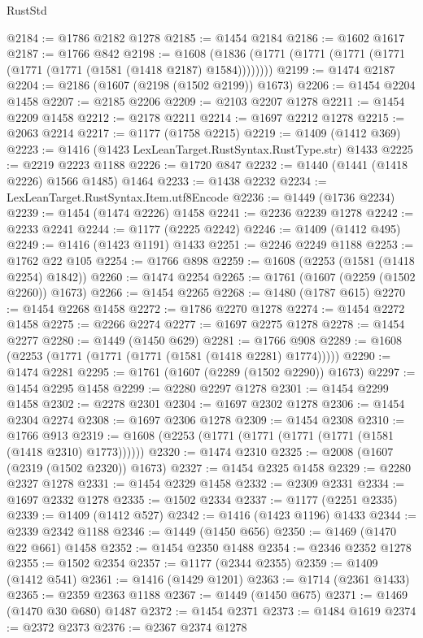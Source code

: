 \begin{lexlean}{RustStd}
\begin{coremodule}
@2184 := @1786 @2182 @1278
@2185 := @1454 @2184
@2186 := @1602 @1617
@2187 := @1766 @842
@2198 := @1608 (@1836 (@1771 (@1771 (@1771 (@1771 (@1771 (@1771 (@1581 (@1418 @2187) @1584))))))))
@2199 := @1474 @2187
@2204 := @2186 (@1607 (@2198 (@1502 @2199)) @1673)
@2206 := @1454 @2204 @1458
@2207 := @2185 @2206
@2209 := @2103 @2207 @1278
@2211 := @1454 @2209 @1458
@2212 := @2178 @2211
@2214 := @1697 @2212 @1278
@2215 := @2063 @2214
@2217 := @1177 (@1758 @2215)
@2219 := @1409 (@1412 @369)
@2223 := @1416 (@1423 LexLeanTarget.RustSyntax.RustType.str) @1433
@2225 := @2219 @2223 @1188
@2226 := @1720 @847
@2232 := @1440 (@1441 (@1418 @2226) @1566 @1485) @1464
@2233 := @1438 @2232
@2234 := LexLeanTarget.RustSyntax.Item.utf8Encode
@2236 := @1449 (@1736 @2234)
@2239 := @1454 (@1474 @2226) @1458
@2241 := @2236 @2239 @1278
@2242 := @2233 @2241
@2244 := @1177 (@2225 @2242)
@2246 := @1409 (@1412 @495)
@2249 := @1416 (@1423 @1191) @1433
@2251 := @2246 @2249 @1188
@2253 := @1762 @22 @105
@2254 := @1766 @898
@2259 := @1608 (@2253 (@1581 (@1418 @2254) @1842))
@2260 := @1474 @2254
@2265 := @1761 (@1607 (@2259 (@1502 @2260)) @1673)
@2266 := @1454 @2265
@2268 := @1480 (@1787 @615)
@2270 := @1454 @2268 @1458
@2272 := @1786 @2270 @1278
@2274 := @1454 @2272 @1458
@2275 := @2266 @2274
@2277 := @1697 @2275 @1278
@2278 := @1454 @2277
@2280 := @1449 (@1450 @629)
@2281 := @1766 @908
@2289 := @1608 (@2253 (@1771 (@1771 (@1771 (@1581 (@1418 @2281) @1774)))))
@2290 := @1474 @2281
@2295 := @1761 (@1607 (@2289 (@1502 @2290)) @1673)
@2297 := @1454 @2295 @1458
@2299 := @2280 @2297 @1278
@2301 := @1454 @2299 @1458
@2302 := @2278 @2301
@2304 := @1697 @2302 @1278
@2306 := @1454 @2304 @2274
@2308 := @1697 @2306 @1278
@2309 := @1454 @2308
@2310 := @1766 @913
@2319 := @1608 (@2253 (@1771 (@1771 (@1771 (@1771 (@1581 (@1418 @2310) @1773))))))
@2320 := @1474 @2310
@2325 := @2008 (@1607 (@2319 (@1502 @2320)) @1673)
@2327 := @1454 @2325 @1458
@2329 := @2280 @2327 @1278
@2331 := @1454 @2329 @1458
@2332 := @2309 @2331
@2334 := @1697 @2332 @1278
@2335 := @1502 @2334
@2337 := @1177 (@2251 @2335)
@2339 := @1409 (@1412 @527)
@2342 := @1416 (@1423 @1196) @1433
@2344 := @2339 @2342 @1188
@2346 := @1449 (@1450 @656)
@2350 := @1469 (@1470 @22 @661) @1458
@2352 := @1454 @2350 @1488
@2354 := @2346 @2352 @1278
@2355 := @1502 @2354
@2357 := @1177 (@2344 @2355)
@2359 := @1409 (@1412 @541)
@2361 := @1416 (@1429 @1201)
@2363 := @1714 (@2361 @1433)
@2365 := @2359 @2363 @1188
@2367 := @1449 (@1450 @675)
@2371 := @1469 (@1470 @30 @680) @1487
@2372 := @1454 @2371
@2373 := @1484 @1619
@2374 := @2372 @2373
@2376 := @2367 @2374 @1278

\end{coremodule}
\end{lexlean}

